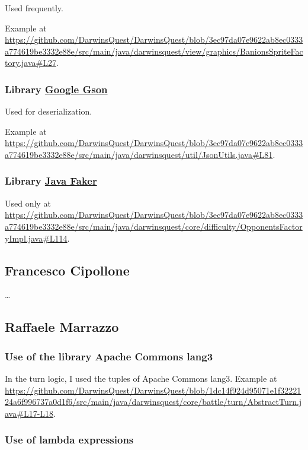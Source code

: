 \documentclass[12pt, a4paper]{report}
\begin{document}
        Used frequently.

        Example at \url{https://github.com/DarwinsQuest/DarwinsQuest/blob/3ec97da07e9622ab8ec0333a774619be3332e88e/src/main/java/darwinsquest/view/graphics/BanionsSpriteFactory.java#L27}.
        
        \subsubsection{Library \href{https://github.com/google/gson}{Google Gson}}
        
        Used for deserialization.

        Example at \url{https://github.com/DarwinsQuest/DarwinsQuest/blob/3ec97da07e9622ab8ec0333a774619be3332e88e/src/main/java/darwinsquest/util/JsonUtils.java#L81}.
        
        \subsubsection{Library \href{https://github.com/DiUS/java-faker}{Java Faker}}
        
        Used only at \url{https://github.com/DarwinsQuest/DarwinsQuest/blob/3ec97da07e9622ab8ec0333a774619be3332e88e/src/main/java/darwinsquest/core/difficulty/OpponentsFactoryImpl.java#L114}.

    \subsection*{Francesco Cipollone}

    \dots

    \subsection*{Raffaele Marrazzo}

    \subsubsection{Use of the library Apache Commons lang3}
    
    In the turn logic, I used the tuples of Apache Commons lang3.
    Example at \url{https://github.com/DarwinsQuest/DarwinsQuest/blob/1dc14f924d95071e1f3222124a6f996737a0d1f6/src/main/java/darwinsquest/core/battle/turn/AbstractTurn.java#L17-L18}.

    \subsubsection{Use of lambda expressions}
    
\end{document}
